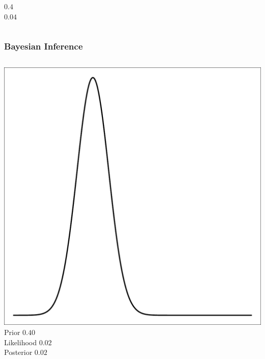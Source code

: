 \documentclass{beamer}
\begin{document}
\begin{frame}[t]
\begin{columns}[c]
\begin{flushright}
                \vspace{10pt}
                \Large $0.4$\\
                \vspace{20pt}
                \Large $0.04$\\
            \end{flushright}
    \end{columns}
\end{frame}

\begin{frame}[t]
    \frametitle{Bayesian Inference}
    \begin{columns}[c]
            \begin{flushright}
                \includegraphics[width=1\textwidth]{bayesian_update_illustration_th1.pdf}\\
                \vspace{10pt}
                \Large Prior \hfill $0.40$\\
                \vspace{20pt}
                \Large Likelihood \hfill $0.02$\\
                \vspace{20pt}
                \Large Posterior \hfill $0.02$

\end{flushright}
\end{columns}
\end{frame}
\end{document}
